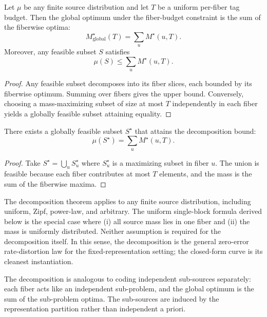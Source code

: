 \begin{theorem}\label{thm:fiberwise-decomposition}
Let $\mu$ be any finite source distribution and let $T$ be a uniform per-fiber tag budget. Then the global optimum under the fiber-budget constraint is the sum of the fiberwise optima:
\[
M^\star_{\mathrm{global}}(T) = \sum_u M^\star(u, T).
\]
Moreover, any feasible subset $S$ satisfies
\[
\mu(S) \le \sum_u M^\star(u, T).
\]
\end{theorem}

\begin{proof}
Any feasible subset decomposes into its fiber slices, each bounded by its fiberwise optimum. Summing over fibers gives the upper bound. Conversely, choosing a mass-maximizing subset of size at most $T$ independently in each fiber yields a globally feasible subset attaining equality.
\end{proof}

\begin{corollary}\label{cor:fiberwise-attainment}
There exists a globally feasible subset $S^\star$ that attains the decomposition bound:
\[
\mu(S^\star) = \sum_u M^\star(u, T).
\]
\end{corollary}

\begin{proof}
Take $S^\star = \bigcup_u S^\star_u$ where $S^\star_u$ is a maximizing subset in fiber $u$. The union is feasible because each fiber contributes at most $T$ elements, and the mass is the sum of the fiberwise maxima.
\end{proof}

\begin{remark}
The decomposition theorem applies to any finite source distribution, including uniform, Zipf, power-law, and arbitrary. The uniform single-block formula derived below is the special case where (i) all source mass lies in one fiber and (ii) the mass is uniformly distributed. Neither assumption is required for the decomposition itself. In this sense, the decomposition is the general zero-error rate-distortion law for the fixed-representation setting; the closed-form curve is its cleanest instantiation.
\end{remark}

\begin{remark}
The decomposition is analogous to coding independent sub-sources separately: each fiber acts like an independent sub-problem, and the global optimum is the sum of the sub-problem optima. The sub-sources are induced by the representation partition rather than independent a priori.
\end{remark}

